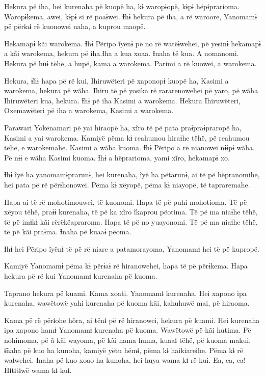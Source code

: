  

 

Hekura pë iha, hei kurenaha pë kuopë ha, kɨ waropɨopë, kɨpɨ
hëpɨprarioma. Waropɨkema, awei, kɨpɨ si rë poaɨwei. Ɨhɨ hekura pë iha, a
rë waroore, Yanomamɨ pë përɨaɨ rë kuonowei naha, a kuprou maopë. 

Hekamapɨ kãi warokema. Ɨhɨ Pẽripo ĩyënɨ pë no rë watëɨwehei, pë yesinɨ
hekamapɨ a kãi warokema, hekura pë iha.Ɨha a kua xoaa. Ɨnaha të kua. A nomanomi. Hekura pë huɨ tëhë, a hupë, kama a warokema. Parimi a rë
kuowei, a warokema. 

Hekura, ɨ̃hɨ hapa pë rë kui, Ihiruwëteri pë xaponopɨ kuopë ha, Kasimi a
warokema, hekura pë wãha. Ihiru të pë yosika rë rararenowehei pë yaro,
pë wãha Ihiruwëteri kua, hekura. Ɨhɨ pë iha Kasimi a warokema. Hekura
Ihiruwëteri, Oxemawëteri pë iha a warokema, Kasimi a warokema. 

Parawari Yokënamari pë yai hiraopë ha, xĩro të pë pata praɨpraɨpraropë
ha, Kasimi a yai warokema. Kamiyë pëma kɨ reahumou hiraɨhe tëhë, pë
reahumou tëhë, e warokemahe. Kasimi a wãha kuoma. Ɨhɨ Pẽripo a rë
nianowei nɨɨpɨ wãha. Pë nɨɨ e wãha Kasimi kuoma. Ɨhɨ a hëprarioma, yami
xĩro, hekamapɨ xo. 

Ɨhɨ ĩyë ha yanomamɨprarunɨ, hei kurenaha, ĩyë ha pëtarunɨ, ai të pë
hëpranomihe, hei pata pë rë përɨhonowei. Pëma kɨ xëyopë, pëma kɨ
niayopë, të tapraremahe. 

Hapa ai të rë mohotimouwei, të kuonomi. Hapa të pë puhi mohotioma. Të pë
xëyou tëhë, praɨɨ kurenaha, të pë ka xĩro ĩkaprou pëotima. Të pë ma
niaɨhe tëhë, të pë imɨkɨ kãi rërëkëapraroma. Hapa të pë no yuayonomi. Të
pë ma niaɨhe tëhë, të pë kãi praɨma. Ɨnaha pë kuaaɨ pëoma. 

Ɨhɨ hei Pẽripo ĩyënɨ të pë rë niare a patamorayoma, Yanomamɨ hei të pë
kupropë. 

 

Kamiyë Yanomamɨ pëma kɨ përɨaɨ rë hiranowehei, hapa të pë përɨkema. Hapa
hekura pë rë kui Yanomamɨ kurenaha pë kuoma. 

Taprano hekura pë kuami. Kama xoati. Yanomamɨ kurenaha. Hei xapono ipa
kurenaha, wawëtowë yahi kurenaha pë kuoma kãi, kahuhuwë mai, pë
hiraoma. 

Kama pë rë përɨohe hõra, ai tënɨ pë rë hiranowei, hekura pë kuami. Hei
kurenaha ipa xapono hamɨ Yanomamɨ kurenaha pë kuoma. Wawëtowë pë kãi
hutima. Pë nohimoma, pë ã kãi wayoma, pë kãi hama huma, kuaaɨ tëhë, pë
kuoma makui, ɨ̃naha pë kuo ha kunoha, kamiyë yëtu hëmɨ, pëma kɨ
haikiareihe. Pëma kɨ rë waɨwehei. Ɨnaha pë kuo xoao ha kunoha, hei huya
wama kɨ rë kui. Ea, ea, ea! Hɨtɨtɨwë wama kɨ kuɨ. 

